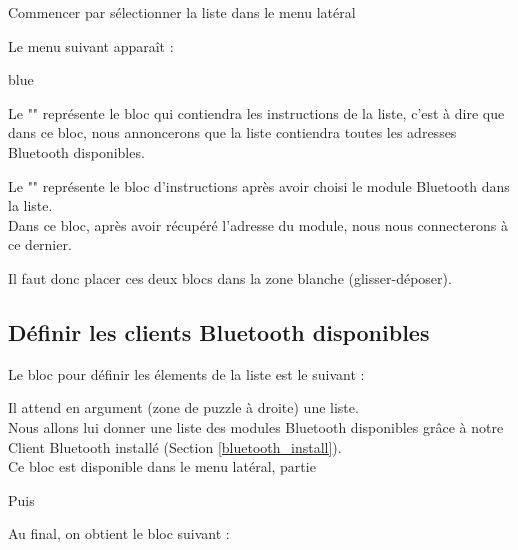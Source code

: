 Commencer par sélectionner la liste  dans le menu latéral


Le menu suivant apparaît : \\


\begin{items}{blue}{\Triangle}
    \item Le "" représente le bloc qui contiendra les instructions de la liste, c'est à dire que dans ce bloc, nous annoncerons que la liste contiendra toutes les adresses Bluetooth disponibles.
    \item Le "" représente le bloc d'instructions après avoir choisi le module Bluetooth dans la liste. \\Dans ce bloc, après avoir récupéré l'adresse du module, nous nous connecterons à ce dernier.
\end{items}

Il faut donc placer ces deux blocs dans la zone blanche (glisser-déposer).

\subsection{Définir les clients Bluetooth disponibles}

Le bloc pour définir les élements de la liste  est le suivant : 


Il attend en argument (zone de puzzle à droite) une liste. \\
Nous allons lui donner une liste des modules Bluetooth disponibles grâce à notre Client Bluetooth installé (Section \ref{bluetooth_install}). \\

Ce bloc est disponible dans le menu latéral, partie 


Puis


Au final, on obtient le bloc suivant : 


